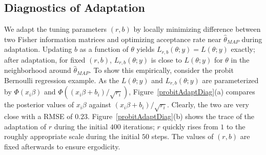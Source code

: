 \documentclass[11pt]{article}
\begin{document}
{
\subsection{Diagnostics of Adaptation}
}
We adapt the tuning parameters $(r,b)$ by locally minimizing difference between two Fisher information matrices and
 optimizing acceptance rate near 
 $\hat\theta_{MAP}$ during adaptation. Updating $b$  as a function
 of $\theta$ yields $L_{r,b}(\theta;y)=L(\theta;y)$ exactly;  after adaptation,
for  fixed
 $(r,b)$, $L_{r,b}(\theta;y)$ is close to $L(\theta;y)$ for $\theta$ in the neighborhood
 around $\hat\theta_{MAP}$. To show this empirically, consider the
 probit Bernoulli regression example. As the $L(\theta;y)$ and $L_{r,b}(\theta;y)$
 are parameterized by $\Phi(x_i\beta)$ and $\Phi(({x_i\beta+b_i})/{\sqrt{r_i}})$, Figure~\ref{probitAdaptDiag}(a) compares the posterior values of $x_i\beta$ against
$({x_i\beta+b_i})/{\sqrt{r_i}}$. Clearly, the two are very close with a
RMSE of $0.23$.
Figure~\ref{probitAdaptDiag}(b) shows the trace of the adaptation of $r$
during
the initial $400$ iterations;
$r$ quickly rises from $1$ to the roughly  appropriate scale during the
initial $50$ steps. The values of $(r,b)$ are fixed afterwards to ensure
ergodicity.
\end{document}
